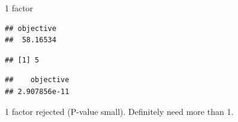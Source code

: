 \documentclass[ignorenonframetext,]{beamer}
\newenvironment{Shaded}{\begin{snugshade}}{\end{snugshade}}
\newcommand{\DataTypeTok}[1]{\textcolor[rgb]{0.13,0.29,0.53}{#1}}
\newcommand{\DecValTok}[1]{\textcolor[rgb]{0.00,0.00,0.81}{#1}}
\newcommand{\KeywordTok}[1]{\textcolor[rgb]{0.13,0.29,0.53}{\textbf{#1}}}
\newcommand{\NormalTok}[1]{#1}
\newcommand{\OperatorTok}[1]{\textcolor[rgb]{0.81,0.36,0.00}{\textbf{#1}}}
\newcommand{\StringTok}[1]{\textcolor[rgb]{0.31,0.60,0.02}{#1}}
\begin{document}
\begin{frame}[fragile]{1 factor}
\protect\hypertarget{factor}{}

\begin{Shaded}
\end{Shaded}

\begin{verbatim}
## objective 
##  58.16534
\end{verbatim}

\begin{Shaded}
\end{Shaded}

\begin{verbatim}
## [1] 5
\end{verbatim}

\begin{Shaded}
\end{Shaded}

\begin{verbatim}
##    objective 
## 2.907856e-11
\end{verbatim}

1 factor rejected (P-value small). Definitely need more than 1.

\end{frame}
\end{document}
